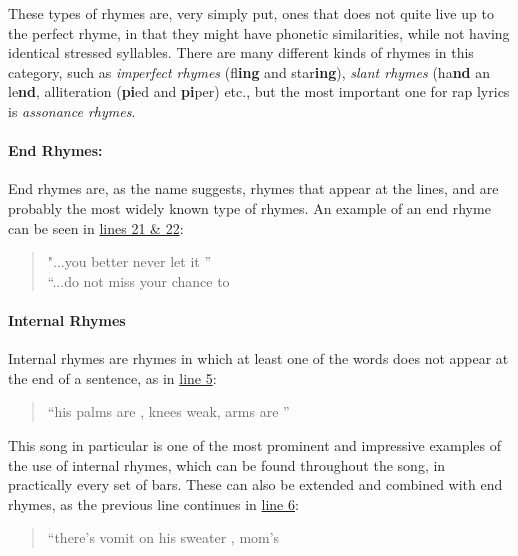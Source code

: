 These types of rhymes are, very simply put, ones that does not quite live up to the perfect rhyme, in that they might have phonetic similarities, while not having identical stressed syllables. There are many different kinds of rhymes in this category, such as \textit{imperfect rhymes} (fl\textbf{ing} and star\textbf{ing}), \textit{slant rhymes} (ha\textbf{nd} an le\textbf{nd}, alliteration (\textbf{pi}ed and \textbf{pi}per) etc., but the most important one for rap lyrics is \textit{assonance rhymes}.

\paragraph{End Rhymes:\\[6pt]}
\label{para:end-rhymes}

End rhymes are, as the name suggests, rhymes that appear at the lines, and are probably the most widely known type of rhymes. An example of an end rhyme can be seen in \hyperref[tab:lose-yourself-lyrics]{lines 21 \& 22}: 

\begin{quote}\small{
    "...you better never let it ” \\
    “...do not miss your chance to }
\end{quote}

\paragraph{Internal Rhymes\\[6pt]}
\label{para:internal-rhymes}

Internal rhymes are rhymes in which at least one of the words does not appear at the end of a sentence, as in \hyperref[tab:lose-yourself-lyrics]{line 5}:
\begin{quote}\small{
    “his palms are , knees weak, arms are ”}
\end{quote}

This song in particular is one of the most prominent and impressive examples of the use of internal rhymes, which can be found throughout the song, in practically every set of bars. These can also be extended and combined with end rhymes, as the previous line continues in \hyperref[tab:lose-yourself-lyrics]{line 6}:

\begin{quote}\small{
    “there’s vomit on his sweater , mom’s }
\end{quote}

